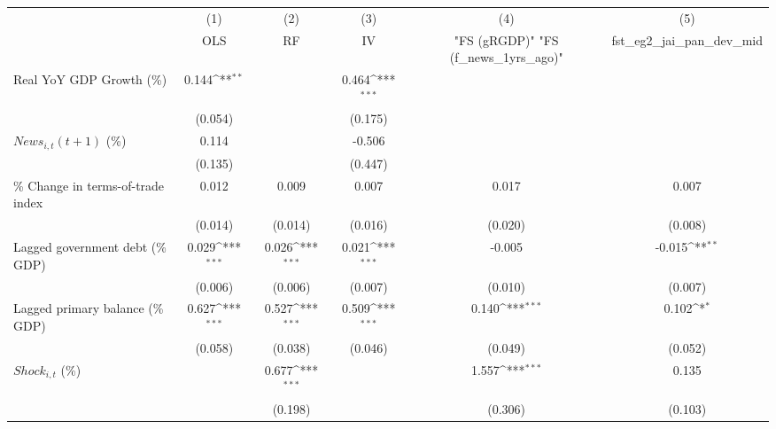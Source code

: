{
\def\sym#1{\ifmmode^{#1}\else\(^{#1}\)\fi}
\begin{tabular}{l*{5}{c}}
\toprule
                    &\multicolumn{1}{c}{(1)}&\multicolumn{1}{c}{(2)}&\multicolumn{1}{c}{(3)}&\multicolumn{1}{c}{(4)}&\multicolumn{1}{c}{(5)}\\
                    &\multicolumn{1}{c}{OLS}&\multicolumn{1}{c}{RF}&\multicolumn{1}{c}{IV}&\multicolumn{1}{c}{ "FS (gRGDP)"  "FS (f_news_1yrs_ago)" }&\multicolumn{1}{c}{fst_eg2_jai_pan_dev_mid}\\
\midrule
Real YoY GDP Growth (\%)&       0.144\sym{**} &                     &       0.464\sym{***}&                     &                     \\
                    &     (0.054)         &                     &     (0.175)         &                     &                     \\
\addlinespace
$ News_{i,t}(t+1)$ (\%)&       0.114         &                     &      -0.506         &                     &                     \\
                    &     (0.135)         &                     &     (0.447)         &                     &                     \\
\addlinespace
\% Change in terms-of-trade index&       0.012         &       0.009         &       0.007         &       0.017         &       0.007         \\
                    &     (0.014)         &     (0.014)         &     (0.016)         &     (0.020)         &     (0.008)         \\
\addlinespace
Lagged government debt (\% GDP)&       0.029\sym{***}&       0.026\sym{***}&       0.021\sym{***}&      -0.005         &      -0.015\sym{**} \\
                    &     (0.006)         &     (0.006)         &     (0.007)         &     (0.010)         &     (0.007)         \\
\addlinespace
Lagged primary balance (\% GDP)&       0.627\sym{***}&       0.527\sym{***}&       0.509\sym{***}&       0.140\sym{***}&       0.102\sym{*}  \\
                    &     (0.058)         &     (0.038)         &     (0.046)         &     (0.049)         &     (0.052)         \\
\addlinespace
$ Shock_{i,t}$ (\%) &                     &       0.677\sym{***}&                     &       1.557\sym{***}&       0.135         \\
                    &                     &     (0.198)         &                     &     (0.306)         &     (0.103)         \\

\end{tabular}}
